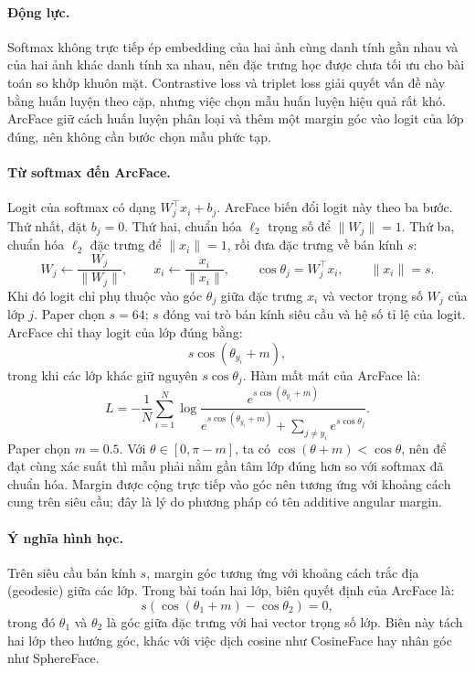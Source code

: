 \documentclass[a4paper,12pt]{article}
\begin{document}
\paragraph{Động lực.} Softmax không trực tiếp ép embedding của hai ảnh cùng danh tính gần nhau và của hai ảnh khác danh tính xa nhau, nên đặc trưng học được chưa tối ưu cho bài toán so khớp khuôn mặt. Contrastive loss và triplet loss giải quyết vấn đề này bằng huấn luyện theo cặp, nhưng việc chọn mẫu huấn luyện hiệu quả rất khó. ArcFace giữ cách huấn luyện phân loại và thêm một margin góc vào logit của lớp đúng, nên không cần bước chọn mẫu phức tạp.

\paragraph{Từ softmax đến ArcFace.} Logit của softmax có dạng $W_j^\top x_i + b_j$. ArcFace biến đổi logit này theo ba bước. Thứ nhất, đặt $b_j = 0$. Thứ hai, chuẩn hóa $\ell_2$ trọng số để $\|W_j\| = 1$. Thứ ba, chuẩn hóa $\ell_2$ đặc trưng để $\|x_i\| = 1$, rồi đưa đặc trưng về bán kính $s$:
$$
    W_j \leftarrow \frac{W_j}{\|W_j\|},
    \qquad
    x_i \leftarrow \frac{x_i}{\|x_i\|},
    \qquad
    \cos\theta_j = W_j^\top x_i,
    \qquad
    \|x_i\| = s.
$$
Khi đó logit chỉ phụ thuộc vào góc $\theta_j$ giữa đặc trưng $x_i$ và vector trọng số $W_j$ của lớp $j$. Paper chọn $s = 64$; $s$ đóng vai trò bán kính siêu cầu và hệ số tỉ lệ của logit. ArcFace chỉ thay logit của lớp đúng bằng:
$$
    s\cos(\theta_{y_i}+m),
$$
trong khi các lớp khác giữ nguyên $s\cos\theta_j$. Hàm mất mát của ArcFace là:
\begin{equation}
    L = -\frac{1}{N}\sum_{i=1}^{N}\log\frac{e^{s\cos(\theta_{y_i}+m)}}{e^{s\cos(\theta_{y_i}+m)}+\sum_{j\ne y_i}e^{s\cos\theta_j}}.
\end{equation}
Paper chọn $m = 0.5$. Với $\theta \in [0,\pi-m]$, ta có $\cos(\theta+m) < \cos\theta$, nên để đạt cùng xác suất thì mẫu phải nằm gần tâm lớp đúng hơn so với softmax đã chuẩn hóa. Margin được cộng trực tiếp vào góc nên tương ứng với khoảng cách cung trên siêu cầu; đây là lý do phương pháp có tên additive angular margin.

\paragraph{Ý nghĩa hình học.} Trên siêu cầu bán kính $s$, margin góc tương ứng với khoảng cách trắc địa (geodesic) giữa các lớp. Trong bài toán hai lớp, biên quyết định của ArcFace là:
$$
    s\left(\cos(\theta_1+m)-\cos\theta_2\right)=0,
$$
trong đó $\theta_1$ và $\theta_2$ là góc giữa đặc trưng với hai vector trọng số lớp. Biên này tách hai lớp theo hướng góc, khác với việc dịch cosine như CosineFace hay nhân góc như SphereFace.
\end{document}
